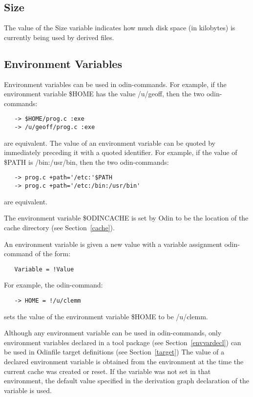 \subsection{Size}

The value of the {\ex Size} variable indicates how much disk space
(in kilobytes) is currently being used by derived files.

\subsection{Environment Variables}
\label{envvar}

Environment variables can be used in odin-commands.
For example, if the environment variable {\ex \$HOME} has the value
{\ex /u/geoff}, then the two odin-commands:
\begin{verbatim}
   -> $HOME/prog.c :exe
   -> /u/geoff/prog.c :exe
\end{verbatim}
are equivalent.
The value of an environment variable can be quoted by immediately 
preceding it with a quoted identifier.
For example, if the value of {\ex \$PATH} is {\ex /bin:/usr/bin},
then the two odin-commands:
\begin{verbatim}
   -> prog.c +path='/etc:'$PATH
   -> prog.c +path='/etc:/bin:/usr/bin'
\end{verbatim}
are equivalent.

The environment variable {\ex \$ODINCACHE} is set by Odin to be the location
of the cache directory (see Section~\ref{cache}).

An environment variable is given a new value
with a variable assignment odin-command of the form:
\begin{verbatim}
   Variable = !Value
\end{verbatim}
For example, the odin-command:
\begin{verbatim}
   -> HOME = !/u/clemm
\end{verbatim}
sets the value of the environment variable {\ex \$HOME} to be {\ex /u/clemm}.

Although any environment variable can be used in odin-commands,
only environment variables declared in a tool package 
(see Section~\ref{envvardecl}) can be used in
{\ex Odinfile} target definitions (see Section~\ref{target})
The value of a declared environment variable is obtained from the
environment at the time the current cache was created or reset.
If the variable was not set in that environment,
the default value specified in the derivation graph declaration
of the variable is used.

